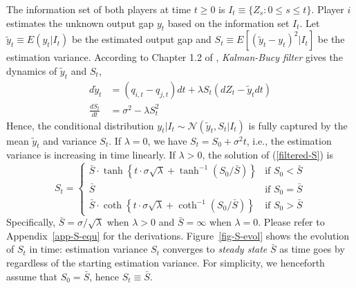 \documentclass[a4paper, 11pt]{article}
\theoremstyle{plain} %
\begin{document}
The information set of both players at time $t \ge 0$ is  $I_{t} \equiv \{Z_{s} : 0\le s \le t\}$. 
Player $i$ estimates the unknown output gap $y_t$ based on the information set $I_t$. 
Let $\tilde{y}_t \equiv E(y_{t}|I_t)$ be the estimated output gap and $S_t \equiv E[(\tilde{y}_{t}-y_{t})^2|I_t]$ be the estimation variance. 
According to Chapter 1.2 of \citet{Bensoussan1992Control}, \emph{Kalman-Bucy filter} gives the dynamics of $\tilde{y}_{t}$ and $S_{t}$, 
\begin{align}
	d\tilde{y}_{t} &= (q_{i,t}-q_{j,t})dt + \lambda S_{t}(dZ_{t}-\tilde{y}_{t}dt) 
	\label{filtered-x}\\
	\frac{dS_{t}}{dt} &= \sigma^2 - \lambda S_{t}^2
	\label{filtered-S}
\end{align} 
Hence, the conditional distribution $y_{t}|I_t\sim\mathcal{N}(\tilde{y}_{t},S_{t}|I_t)$ is fully captured by the mean $\tilde{y}_{t}$ and variance $S_{t}$. 
If $\lambda = 0$, we have $S_t = S_0+\sigma^2t$, i.e., the estimation variance is increasing in time linearly. 
If $\lambda > 0$, the solution of (\ref{filtered-S}) is
\begin{equation}\label{S-evolution} 
	S_t = 
	\begin{cases}
        \bar{S} \cdot \tanh\left\{t\cdot\sigma\sqrt{\lambda} +  \tanh^{-1}\left(S_0\big/\bar{S}\right)\right\} & \text{if } S_0 < \bar{S} \\
        \bar{S} & \text{if } S_0 = \bar{S} \\
        \bar{S} \cdot \coth\left\{t\cdot\sigma\sqrt{\lambda} +  \coth^{-1}\left(S_0\big/\bar{S}\right)\right\} & \text{if } S_0 > \bar{S} 
	\end{cases}
\end{equation}
Specifically, $\bar{S} = \sigma / \sqrt{\lambda}$ when $\lambda>0$ and $\bar{S} = \infty$ when $\lambda = 0$. 
Please refer to Appendix~\ref{app-S-equ} for the derivations. 
Figure~\ref{fig-S-evol} shows the evolution of $S_t$ in time: estimation variance $S_t$ converges to \emph{steady state} $\bar{S}$ as time goes by regardless of the starting estimation variance. 
For simplicity, we henceforth assume that $S_0 = \bar{S}$, hence $S_t\equiv \bar{S}$. 
\end{document}
